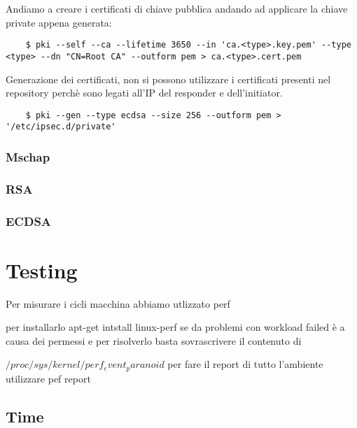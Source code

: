 \documentclass[
10pt, %
a4paper, %
oneside, %
headinclude,footinclude, %
BCOR5mm, %
]{scrartcl}
\begin{document}
Andiamo a creare i certificati di chiave pubblica andando ad applicare la chiave private appena generata:

\begin{lstlisting}
    $ pki --self --ca --lifetime 3650 --in 'ca.<type>.key.pem' --type <type> --dn "CN=Root CA" --outform pem > ca.<type>.cert.pem
\end{lstlisting}

Generazione dei certificati, non si possono utilizzare i certificati presenti nel repository perchè sono legati all'IP del responder e dell'initiator.
\begin{lstlisting}
    $ pki --gen --type ecdsa --size 256 --outform pem > '/etc/ipsec.d/private'
\end{lstlisting} 

\subsubsection{Mschap}

\subsubsection{RSA}

\subsubsection{ECDSA}



\section{Testing}

Per misurare i cicli macchina abbiamo utlizzato perf 

per installarlo apt-get intstall linux-perf se da problemi con workload failed è a causa dei permessi e per risolverlo basta sovrascrivere il contenuto di


$/proc/sys/kernel/perf_event_paranoid$
per fare il report di tutto l'ambiente utilizzare pef report
\subsection{Time}
\end{document}
